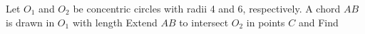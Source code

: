 Let $O_1$ and $O_2$ be concentric circles with radii 4 and 6, respectively.  A chord $AB$ is drawn in $O_1$ with length   Extend $AB$ to intersect $O_2$ in points $C$ and   Find 